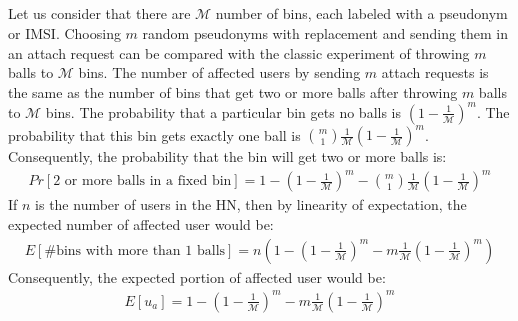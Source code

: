 \documentclass{llncs} %
\begin{document}
\begin{subappendices}
\renewcommand{\thesection}{\Alph{section}}%

\section{} \label{appendix:A}
Let us consider that there are $\mathcal{M}$ number of bins, each labeled with a pseudonym or IMSI. Choosing $m$ random pseudonyms with replacement and sending them in an attach request can be compared with the classic experiment of throwing $m$ balls to $\mathcal{M}$ bins. The number of affected users by sending $m$ attach requests is the same as the number of bins that get two or more balls after throwing $m$ balls to $\mathcal{M}$ bins. The probability that a particular bin gets no balls is $\left(1-\frac{1}{\mathcal{M}}\right)^m$. The probability that this bin gets exactly one ball is $\binom{m}{1}\frac{1}{\mathcal{M}}\left(1-\frac{1}{\mathcal{M}}\right)^m$. Consequently, the probability that the bin will get two or more balls is:
\begin{eqnarray*}
 Pr[\text{2 or more balls in a fixed bin}] = 1 - \left(1-\frac{1}{\mathcal{M}}\right)^m - \binom{m}{1}\frac{1}{\mathcal{M}}\left(1-\frac{1}{\mathcal{M}}\right)^m
\end{eqnarray*}
If $n$ is the number of users in the HN, then by linearity of expectation, the expected number of affected user would be:
\begin{eqnarray*}
E[\# \text{bins with more than 1 balls}] = n\left(1 - \left(1-\frac{1}{\mathcal{M}}\right)^m - m\frac{1}{\mathcal{M}}\left(1-\frac{1}{\mathcal{M}}\right)^m\right)
\end{eqnarray*}
Consequently, the expected portion of affected user would be:
\begin{eqnarray*}
 E[u_a] = 1 - \left(1-\frac{1}{\mathcal{M}}\right)^m - m\frac{1}{\mathcal{M}}\left(1-\frac{1}{\mathcal{M}}\right)^m
\end{eqnarray*}



\end{subappendices}
\end{document}
